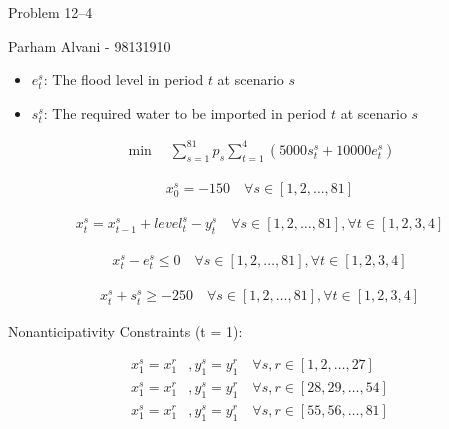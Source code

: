 \documentclass{article}
\begin{document}
\large %


{\Large Problem 12--4 %
\hfill  }

\begin{center}
{\Large Parham Alvani - 98131910} %
\end{center}
\vspace{0.05in}

\par
\begin{itemize}
        \item \(e_{t}^{s}\): The flood level in period \(t\) at scenario \(s\)
        \item \(s_{t}^{s}\): The required water to be imported in period \(t\) at scenario \(s\)
\end{itemize}

\begin{align*}
        \min \quad \sum_{s = 1}^{81} p_{s} \sum_{t = 1}^{4} (5000 s_{t}^{s} + 10000 e_{t}^{s})
\end{align*}

\begin{align*}
        x_{0}^{s} = -150 \quad \forall s \in [1, 2, \ldots, 81]
\end{align*}

\begin{align*}
        x_{t}^{s} = x_{t-1}^{s} + level_{t}^{s} - y_{t}^{s} \quad \forall s \in [1, 2, \ldots, 81], \forall t \in [1, 2, 3, 4]
\end{align*}

\begin{align*}
        x_{t}^{s} - e_{t}^{s} \le 0 \quad \forall s \in [1, 2, \ldots, 81], \forall t \in [1, 2, 3, 4]
\end{align*}

\begin{align*}
        x_{t}^{s} + s_{t}^{s} \ge -250 \quad \forall s \in [1, 2, \ldots, 81], \forall t \in [1, 2, 3, 4]
\end{align*}

\par
Nonanticipativity Constraints (t = 1):

\begin{align*}
        x_{1}^{s} = x_{1}^{r}&, y_{1}^{s} = y_{1}^{r} \quad \forall s, r \in [1, 2, \ldots, 27]\\
        x_{1}^{s} = x_{1}^{r}&, y_{1}^{s} = y_{1}^{r} \quad \forall s, r \in [28, 29, \ldots, 54]\\
        x_{1}^{s} = x_{1}^{r}&, y_{1}^{s} = y_{1}^{r} \quad \forall s, r \in [55, 56, \ldots, 81]
\end{align*}
\end{document}
